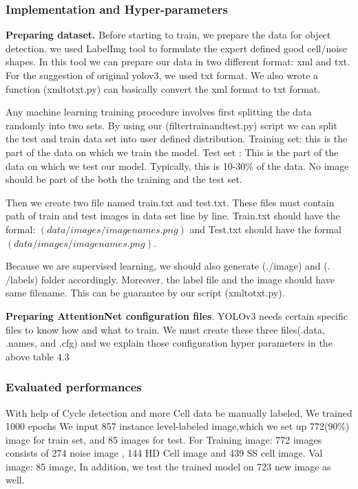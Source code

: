 \subsubsection{Implementation and Hyper-parameters}

\textbf{Preparing dataset.} Before starting to train, we prepare the data for object detection. we used LabelImg tool to formulate the expert defined good cell/noise shapes. In this tool we can prepare our data in two different format: xml and txt. For the suggestion of original yolov3, we used txt format. We also wrote a function (xmltotxt.py) can basically convert the xml format to txt format. 

Any machine learning training procedure involves first splitting the data randomly into two sets. By using our (filtertrainandtest.py) script we can split the test and train data set into user defined distribution. Training set: this is the part of the data on which we train the model. Test set : This is the part of the data on which we test our model. Typically, this is 10-30\% of the data. No image should be part of the both the training and the test set.

Then we create two file named train.txt and test.txt. These files must contain path of train and test images in data set line by line. Train.txt should have the formal: $(data/images/imagenames.png)$ and Test.txt should have the formal $(data/images/imagenames.png)$.

Because we are supervised learning, we should also generate (./image) and (. /labels) folder accordingly. Moreover, the label file and the image should have same filename. This can be guarantee by our script (xmltotxt.py).

\textbf{Preparing AttentionNet configuration files}. YOLOv3 needs certain specific files to know how and what to train. We must create these three files(.data, .names, and .cfg) and we explain those configuration hyper parameters in the above table 4.3\\

\subsubsection{Evaluated performances}
With help of Cycle detection and more Cell data be manually labeled, We trained 1000 epochs We input 857 instance level-labeled image,which we set up 772(90\%) image for train set, and 85 images for test. For Training image: 772 images consists of 274 noise image , 144 HD Cell image and  439 SS cell image. Val image: 85 image, In addition, we test the trained model on 723 new image as well.


